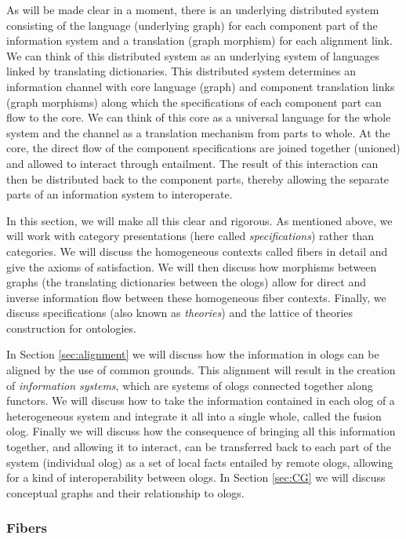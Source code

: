 As will be made clear in a moment, 
there is an underlying distributed system consisting of 
the language (underlying graph) for each component part of the information system and 
a translation (graph morphism) for each alignment link. 
We can think of this distributed system
as an underlying system of languages linked by translating dictionaries.
This distributed system determines an information channel 
with core language (graph) and component translation links (graph morphisms)
along which the specifications of each component part can flow to the core.
We can think of this core as a universal language for the whole system
and the channel as a translation mechanism from parts to whole.
At the core, 
the direct flow of the component specifications are joined together (unioned) and allowed to interact through entailment. 
The result of this interaction can then be distributed back to the component parts,
thereby allowing the separate parts of an information system to interoperate.

In this section, we will make all this clear and rigorous. 
As mentioned above, we will work with category presentations (here called {\em specifications}) rather than categories. 
We will discuss the homogeneous contexts called fibers in detail and give the axioms of satisfaction. 
We will then discuss how morphisms between graphs (the translating dictionaries between the  ologs) allow for direct and inverse information flow between these homogeneous fiber contexts. 
Finally, we discuss specifications (also known as {\em theories}) and the lattice of theories construction for ontologies.

In Section \ref{sec:alignment} 
we will discuss how the information in ologs can be aligned by the use of common grounds. 
This alignment will result in the creation of {\em information systems}, 
which are systems of ologs connected together along functors. 
We will discuss how to take the information contained in each olog of a heterogeneous system and integrate it all into a single whole, called the fusion olog. Finally we will discuss how the consequence of bringing all this information together, and allowing it to interact, can be transferred back to each part of the system (individual olog) as a set of local facts entailed by remote ologs, allowing for a kind of interoperability between ologs.
In Section \ref{sec:CG} we will discuss conceptual graphs and their relationship to ologs.

\subsubsection{Fibers}\label{sec:fibers}

